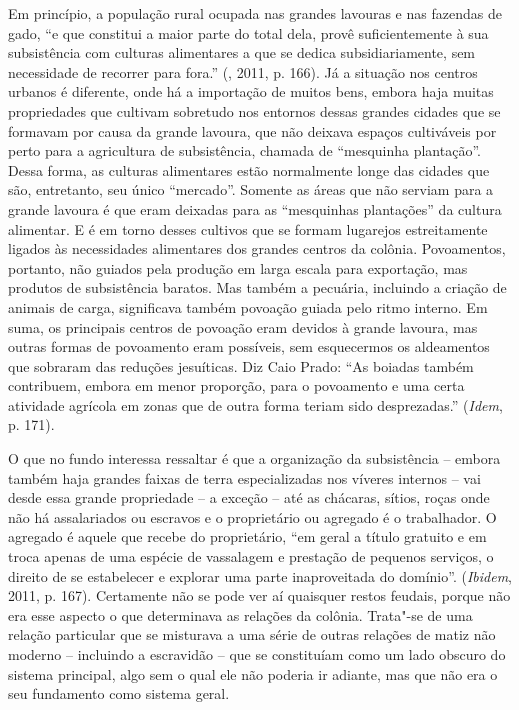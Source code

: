 Em princípio, a população rural ocupada nas grandes lavouras e nas
fazendas de gado, ``e que constitui a maior parte do total dela, provê
suficientemente à sua subsistência com culturas alimentares a que se
dedica subsidiariamente, sem necessidade de recorrer para fora.''
(, 2011, p. 166). Já a situação nos centros urbanos é diferente,
onde há a importação de muitos bens, embora haja muitas propriedades que
cultivam sobretudo nos entornos dessas grandes cidades que se formavam
por causa da grande lavoura, que não deixava espaços cultiváveis por
perto para a agricultura de subsistência, chamada de ``mesquinha
plantação''. Dessa forma, as culturas alimentares estão normalmente
longe das cidades que são, entretanto, seu único ``mercado''. Somente as
áreas que não serviam para a grande lavoura é que eram deixadas para as
``mesquinhas plantações'' da cultura alimentar. E é em torno desses
cultivos que se formam lugarejos estreitamente ligados às necessidades
alimentares dos grandes centros da colônia. Povoamentos, portanto, não
guiados pela produção em larga escala para exportação, mas produtos de
subsistência baratos. Mas também a pecuária, incluindo a criação de
animais de carga, significava também povoação guiada pelo ritmo interno.
Em suma, os principais centros de povoação eram devidos à grande
lavoura, mas outras formas de povoamento eram possíveis, sem esquecermos
os aldeamentos que sobraram das reduções jesuíticas. Diz Caio Prado:
``As boiadas também contribuem, embora em menor proporção, para o
povoamento e uma certa atividade agrícola em zonas que de outra forma
teriam sido desprezadas.'' (\emph{Idem}, p. 171).

O que no fundo interessa ressaltar é que a organização da subsistência
-- embora também haja grandes faixas de terra especializadas nos víveres
internos -- vai desde essa grande propriedade -- a exceção -- até as
chácaras, sítios, roças onde não há assalariados ou escravos e o
proprietário ou agregado é o trabalhador. O agregado é aquele que recebe
do proprietário, ``em geral a título gratuito e em troca apenas de uma
espécie de vassalagem e prestação de pequenos serviços, o direito de se
estabelecer e explorar uma parte inaproveitada do domínio''.
(\emph{Ibidem}, 2011, p. 167). Certamente não se pode ver aí quaisquer
restos feudais, porque não era esse aspecto o que determinava as
relações da colônia. Trata"-se de uma relação particular que se misturava
a uma série de outras relações de matiz não moderno -- incluindo a
escravidão -- que se constituíam como um lado obscuro do sistema
principal, algo sem o qual ele não poderia ir adiante, mas que não era o
seu fundamento como sistema geral.

